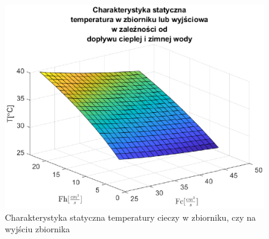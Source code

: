 \begin{figure}[h!]
   \centering
   \includegraphics{img/static/staticT.eps}
   \caption{Charakterystyka statyczna temperatury cieczy w zbiorniku, czy na wyjściu zbiornika}
   \label{fig:staticT}
\end{figure}
            
